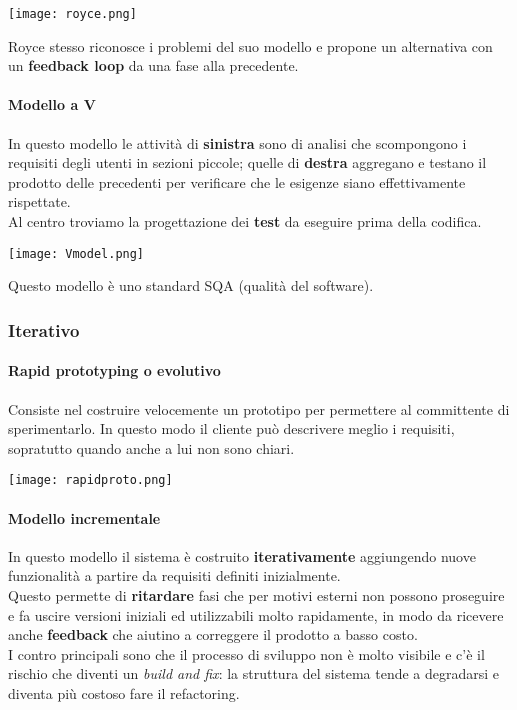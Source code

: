 \begin{center}
	\texttt{[image: royce.png]}
\end{center}

\begin{note}
	Royce stesso riconosce i problemi del suo modello e propone un alternativa con un \textbf{feedback loop} da una fase alla precedente.
\end{note}

\paragraph{Modello a V}
In questo modello le attività di \textbf{sinistra} sono di analisi che scompongono i requisiti degli utenti in sezioni piccole; quelle di \textbf{destra} aggregano e testano il prodotto delle precedenti per verificare che le esigenze siano effettivamente rispettate.\\
Al centro troviamo la progettazione dei \textbf{test} da eseguire prima della codifica.
\begin{center}
	\texttt{[image: Vmodel.png]}
\end{center}

\begin{note}
	Questo modello è uno standard SQA (qualità del software).
\end{note}

\subsubsection{Iterativo}
\paragraph{Rapid prototyping o evolutivo}
Consiste nel costruire velocemente un prototipo per permettere al committente di sperimentarlo. In questo modo il cliente può descrivere meglio i requisiti, sopratutto quando anche a lui non sono chiari.
\begin{center}
	\texttt{[image: rapidproto.png]}
\end{center}

\paragraph{Modello incrementale}
In questo modello il sistema è costruito \textbf{iterativamente} aggiungendo nuove funzionalità a partire da requisiti definiti inizialmente.\\
Questo permette di \textbf{ritardare} fasi che per motivi esterni non possono proseguire e fa uscire versioni iniziali ed utilizzabili molto rapidamente, in modo da ricevere anche \textbf{feedback} che aiutino a correggere il prodotto a basso costo.\\
I contro principali sono che il processo di sviluppo non è molto visibile e c'è il rischio che diventi un \textit{build and fix}: la struttura del sistema tende a degradarsi e diventa più costoso fare il refactoring.

